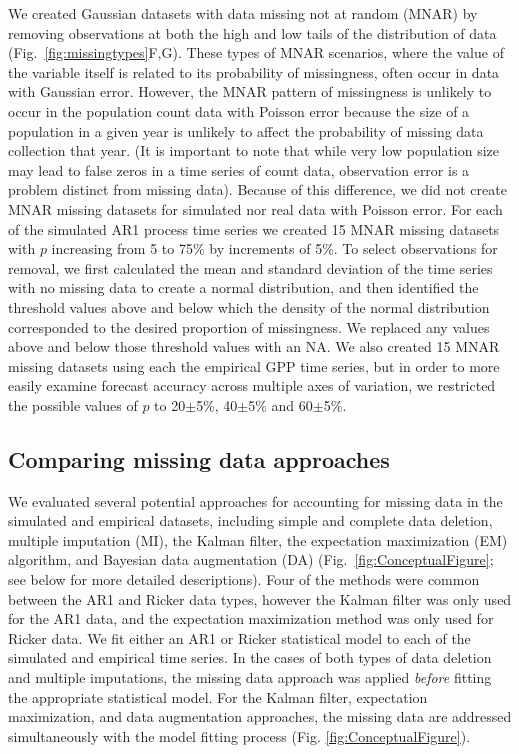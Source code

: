 \documentclass{article}
\begin{document}
\begin{linenumbers}
We created Gaussian datasets with data missing not at random (MNAR) by removing observations at both the high and low tails of the distribution of data (Fig.\ \ref{fig:missingtypes}F,G). These types of MNAR scenarios, where the value of the variable itself is related to its probability of missingness, often occur in data with Gaussian error. However, the MNAR pattern of missingness is unlikely to occur in the population count data with Poisson error because the size of a population in a given year is unlikely to affect the probability of missing data collection that year. (It is important to note that while very low population size may lead to false zeros in a time series of count data, observation error is a problem distinct from missing data). Because of this difference, we did not create MNAR missing datasets for simulated nor real data with Poisson error. For each of the simulated AR1 process time series we created 15 MNAR missing datasets with $p$ increasing from 5 to 75\% by increments of 5\%. To select observations for removal, we first calculated the mean and standard deviation of the time series with no missing data to create a normal distribution, and then identified the threshold values above and below which the density of the normal distribution corresponded to the desired proportion of missingness. We replaced any values above and below those threshold values with an NA. We also created 15 MNAR missing datasets using each the empirical GPP time series, but in order to more easily examine forecast accuracy across multiple axes of variation, we restricted the possible values of $p$ to 20$\pm$5\%, 40$\pm$5\% and 60$\pm$5\%.


\subsection*{Comparing missing data approaches}

We evaluated several potential approaches for accounting for missing data in the simulated and empirical datasets, including simple and complete data deletion, multiple imputation (MI), the Kalman filter, the expectation maximization (EM) algorithm, and Bayesian data augmentation (DA) (Fig.\ \ref{fig:ConceptualFigure}; see below for more detailed descriptions). Four of the methods were common between the AR1 and Ricker data types, however the Kalman filter was only used for the AR1 data, and the expectation maximization method was only used for Ricker data. We fit either an AR1 or Ricker statistical model to each of the simulated and empirical time series. In the cases of both types of data deletion and multiple imputations, the missing data approach was applied \textit{before} fitting the appropriate statistical model. For the Kalman filter, expectation maximization, and data augmentation approaches, the missing data are addressed simultaneously with the model fitting process (Fig. \ref{fig:ConceptualFigure}). 


\end{linenumbers}
\end{document}
